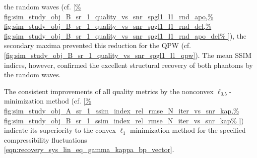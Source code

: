 the random waves
(cf. \cref{%
  fig:sim_study_obj_B_sr_1_quality_vs_snr_spgl1_l1_rnd_apo,%
  fig:sim_study_obj_B_sr_1_quality_vs_snr_spgl1_l1_rnd_del,%
  fig:sim_study_obj_B_sr_1_quality_vs_snr_spgl1_l1_rnd_apo_del%
}),
the secondary maxima prevented
this reduction for
the \ac{QPW}
(cf. \cref{fig:sim_study_obj_B_sr_1_quality_vs_snr_spgl1_l1_qpw}).
The mean \ac{SSIM} indices, however, confirmed
the excellent structural recovery of both
phantoms by
the random waves.

The consistent improvements of
all quality metrics by
the nonconvex $\ell_{0.5}$-minimization method
(cf. \cref{%
  fig:sim_study_obj_A_sr_1_ssim_index_rel_rmse_N_iter_vs_snr_kap,%
  fig:sim_study_obj_B_sr_1_ssim_index_rel_rmse_N_iter_vs_snr_kap%
}) indicate
its superiority to
the convex $\ell_{1}$-minimization method
 for
the specified compressibility fluctuations
\eqref{eqn:recovery_sys_lin_eq_gamma_kappa_bp_vector}.
